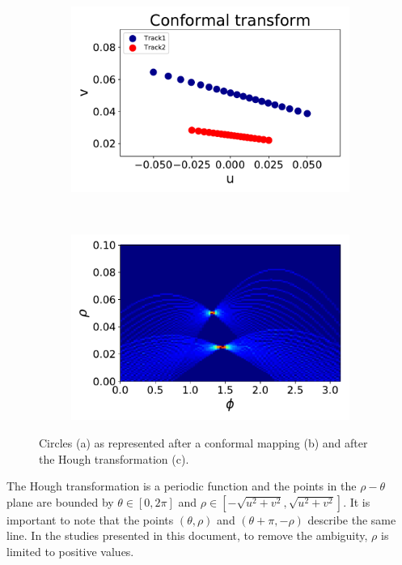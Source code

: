 \begin{figure}[ht]
\begin{subfigure}[b]{0.3\textwidth}
    \end{subfigure}
		~ %
		\begin{subfigure}[b]{0.3\textwidth}
					\includegraphics[width=\textwidth]{figures/circle_CT.pdf}
					\caption{}
			\end{subfigure}
			~ %
			\begin{subfigure}[b]{0.3\textwidth}
						\includegraphics[width=\textwidth]{figures/circle_HT.pdf}
						\caption{}
				\end{subfigure}
	\label{HTcircle}
	\caption{Circles (a) as represented after a conformal mapping (b) and after the Hough transformation (c).}
\end{figure}

The Hough transformation is a periodic function and the points in the $\rho-\theta$ plane are bounded by $\theta \in \left[0, 2\pi\right]$ and $\rho \in \left[-\sqrt{u^2+v^2}, \sqrt{u^2+v^2}\right]$. It is important to note that the points $(\theta, \rho)$ and $(\theta+\pi, -\rho)$ describe the same line. In the studies presented in this document, to remove the ambiguity, $\rho$ is limited to positive values.



